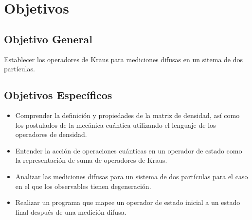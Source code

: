 \section{Objetivos}

\subsection{Objetivo General}

Establecer los operadores de Kraus para mediciones difusas en un sitema de dos partículas. 


\subsection{Objetivos Específicos}
\begin{itemize}
	\item Comprender la definición y propiedades de la matriz de densidad, así como los postulados de la mecánica cuántica utilizando el lenguaje de los operadores de densidad.
	
	\item Entender la acción de operaciones cuánticas en un operador de estado como la representación de suma de operadores de Kraus. 

	\item Analizar las mediciones difusas para un sistema de dos partículas para el caso en el que los observables tienen degeneración.
	
	\item Realizar un programa que mapee un operador de estado inicial a un estado final después de una medición difusa.

	
	
\end{itemize}